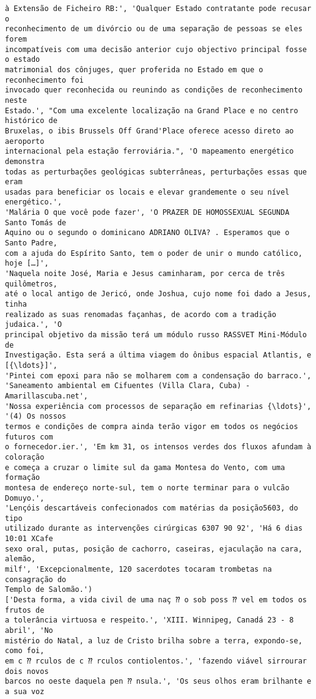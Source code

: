 \documentclass[10pt]{article}
\begin{document}
\begin{Verbatim}[commandchars=\\\{\}]
à Extensão de Ficheiro RB:', 'Qualquer Estado contratante pode recusar o
reconhecimento de um divórcio ou de uma separação de pessoas se eles forem
incompatíveis com uma decisão anterior cujo objectivo principal fosse o estado
matrimonial dos cônjuges, quer proferida no Estado em que o reconhecimento foi
invocado quer reconhecida ou reunindo as condições de reconhecimento neste
Estado.', "Com uma excelente localização na Grand Place e no centro histórico de
Bruxelas, o ibis Brussels Off Grand'Place oferece acesso direto ao aeroporto
internacional pela estação ferroviária.", 'O mapeamento energético demonstra
todas as perturbações geológicas subterrâneas, perturbações essas que eram
usadas para beneficiar os locais e elevar grandemente o seu nível energético.',
'Malária O que você pode fazer', 'O PRAZER DE HOMOSSEXUAL SEGUNDA Santo Tomás de
Aquino ou o segundo o dominicano ADRIANO OLIVA? . Esperamos que o Santo Padre,
com a ajuda do Espírito Santo, tem o poder de unir o mundo católico, hoje […]',
'Naquela noite José, Maria e Jesus caminharam, por cerca de três quilômetros,
até o local antigo de Jericó, onde Joshua, cujo nome foi dado a Jesus, tinha
realizado as suas renomadas façanhas, de acordo com a tradição judaica.', 'O
principal objetivo da missão terá um módulo russo RASSVET Mini-Módulo de
Investigação. Esta será a última viagem do ônibus espacial Atlantis, e [{\ldots}]',
'Pintei com epoxi para não se molharem com a condensação do barraco.',
'Saneamento ambiental em Cifuentes (Villa Clara, Cuba) - Amarillascuba.net',
'Nossa experiência com processos de separação em refinarias {\ldots}', '(4) Os nossos
termos e condições de compra ainda terão vigor em todos os negócios futuros com
o fornecedor.ier.', 'Em km 31, os intensos verdes dos fluxos afundam à coloração
e começa a cruzar o limite sul da gama Montesa do Vento, com uma formação
montesa de endereço norte-sul, tem o norte terminar para o vulcão Domuyo.',
'Lençóis descartáveis confecionados com matérias da posição5603, do tipo
utilizado durante as intervenções cirúrgicas 6307 90 92', 'Há 6 dias 10:01 XCafe
sexo oral, putas, posição de cachorro, caseiras, ejaculação na cara, alemão,
milf', 'Excepcionalmente, 120 sacerdotes tocaram trombetas na consagração do
Templo de Salomão.')
['Desta forma, a vida civil de uma naç ⁇ o sob poss ⁇ vel em todos os frutos de
a tolerância virtuosa e respeito.', 'XIII. Winnipeg, Canadá 23 - 8 abril', 'No
mistério do Natal, a luz de Cristo brilha sobre a terra, expondo-se, como foi,
em c ⁇ rculos de c ⁇ rculos contiolentos.', 'fazendo viável sirrourar dois novos
barcos no oeste daquela pen ⁇ nsula.', 'Os seus olhos eram brilhante e a sua voz

\end{Verbatim}
\end{document}
